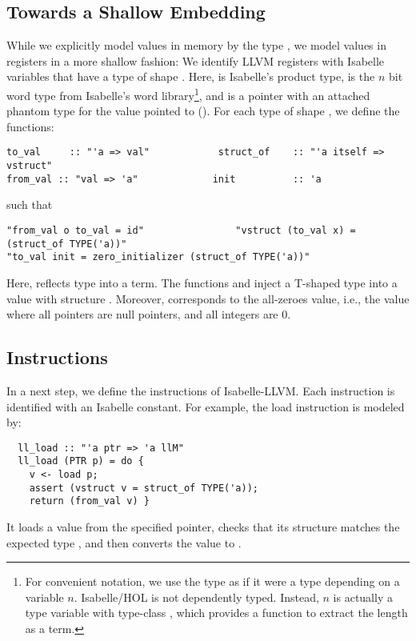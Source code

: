 \documentclass[a4paper,USenglish,cleveref, autoref]{lipics-v2019}
\begin{document}
\subsection{Towards a Shallow Embedding}
While we explicitly model values in memory by the type , we model values in registers in a more shallow fashion:
We identify LLVM registers with Isabelle variables that have a type of shape . 
Here, \q{\is{\x}} is Isabelle's product type,  is the $n$ bit word type from Isabelle's word 
library\cprotect\footnote{For convenient notation, we use the type  as if it were a type depending on a variable $n$. 
Isabelle/HOL is not dependently typed. Instead, $n$ is actually a type variable with type-class , which provides a 
function  to extract the length as a term.}, 
and  is a pointer with an attached phantom type for the value pointed to ().
%
For each type  of shape , we define the functions:
\begin{lstlisting}
to_val     :: "'a => val"            struct_of    :: "'a itself => vstruct"
from_val :: "val => 'a"             init          :: 'a
\end{lstlisting}
such that
\begin{lstlisting}
"from_val o to_val = id"                "vstruct (to_val x) = (struct_of TYPE('a))"
"to_val init = zero_initializer (struct_of TYPE('a))"
\end{lstlisting}
Here,  reflects type  into a term.
The functions  and  inject a T-shaped type  into a value with structure .
Moreover,  corresponds to the all-zeroes value, i.e., the value where all pointers are null pointers, and all integers are $0$.

\subsection{Instructions}
In a next step, we define the instructions of Isabelle-LLVM. Each instruction is identified with an Isabelle constant. For example, the load instruction
is modeled by:
\begin{lstlisting}
  ll_load :: "'a ptr => 'a llM"
  ll_load (PTR p) = do {
    v <- load p;
    assert (vstruct v = struct_of TYPE('a));
    return (from_val v) }
\end{lstlisting}
It loads a value from the specified pointer, checks that its structure matches the expected type , and then 
converts the value to . 
\end{document}
